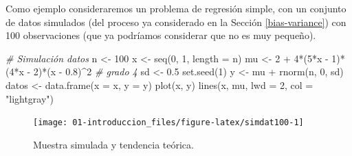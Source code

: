 \documentclass[
]{book}
\newenvironment{Shaded}{\begin{snugshade}}{\end{snugshade}}
\newcommand{\AttributeTok}[1]{\textcolor[rgb]{0.77,0.63,0.00}{#1}}
\newcommand{\CommentTok}[1]{\textcolor[rgb]{0.56,0.35,0.01}{\textit{#1}}}
\newcommand{\DecValTok}[1]{\textcolor[rgb]{0.00,0.00,0.81}{#1}}
\newcommand{\FloatTok}[1]{\textcolor[rgb]{0.00,0.00,0.81}{#1}}
\newcommand{\FunctionTok}[1]{\textcolor[rgb]{0.00,0.00,0.00}{#1}}
\newcommand{\NormalTok}[1]{#1}
\newcommand{\OtherTok}[1]{\textcolor[rgb]{0.56,0.35,0.01}{#1}}
\newcommand{\SpecialCharTok}[1]{\textcolor[rgb]{0.00,0.00,0.00}{#1}}
\newcommand{\StringTok}[1]{\textcolor[rgb]{0.31,0.60,0.02}{#1}}
\theoremstyle{break}
\theoremstyle{definition}
\theoremstyle{definition}
\theoremstyle{definition}
\theoremstyle{definition}
\theoremstyle{remark}
\begin{document}
Como ejemplo consideraremos un problema de regresión simple, con un conjunto de datos simulados (del proceso ya considerado en la Sección \ref{bias-variance}) con 100 observaciones (que ya podríamos considerar que no es muy pequeño).

\begin{Shaded}
\begin{Highlighting}[]
\CommentTok{\# Simulación datos}
\NormalTok{n }\OtherTok{\textless{}{-}} \DecValTok{100}
\NormalTok{x }\OtherTok{\textless{}{-}} \FunctionTok{seq}\NormalTok{(}\DecValTok{0}\NormalTok{, }\DecValTok{1}\NormalTok{, }\AttributeTok{length =}\NormalTok{ n)}
\NormalTok{mu }\OtherTok{\textless{}{-}} \DecValTok{2} \SpecialCharTok{+} \DecValTok{4}\SpecialCharTok{*}\NormalTok{(}\DecValTok{5}\SpecialCharTok{*}\NormalTok{x }\SpecialCharTok{{-}} \DecValTok{1}\NormalTok{)}\SpecialCharTok{*}\NormalTok{(}\DecValTok{4}\SpecialCharTok{*}\NormalTok{x }\SpecialCharTok{{-}} \DecValTok{2}\NormalTok{)}\SpecialCharTok{*}\NormalTok{(x }\SpecialCharTok{{-}} \FloatTok{0.8}\NormalTok{)}\SpecialCharTok{\^{}}\DecValTok{2} \CommentTok{\# grado 4}
\NormalTok{sd }\OtherTok{\textless{}{-}} \FloatTok{0.5}
\FunctionTok{set.seed}\NormalTok{(}\DecValTok{1}\NormalTok{)}
\NormalTok{y }\OtherTok{\textless{}{-}}\NormalTok{ mu }\SpecialCharTok{+} \FunctionTok{rnorm}\NormalTok{(n, }\DecValTok{0}\NormalTok{, sd)}
\NormalTok{datos }\OtherTok{\textless{}{-}} \FunctionTok{data.frame}\NormalTok{(}\AttributeTok{x =}\NormalTok{ x, }\AttributeTok{y =}\NormalTok{ y)}
\FunctionTok{plot}\NormalTok{(x, y) }
\FunctionTok{lines}\NormalTok{(x, mu, }\AttributeTok{lwd =} \DecValTok{2}\NormalTok{, }\AttributeTok{col =} \StringTok{"lightgray"}\NormalTok{)}
\end{Highlighting}
\end{Shaded}

\begin{figure}[!htb]

{\centering \texttt{[image: 01-introduccion\_files/figure-latex/simdat100-1]} 

}

\caption{Muestra simulada y tendencia teórica.}\label{fig:simdat100}
\end{figure}
\end{document}
